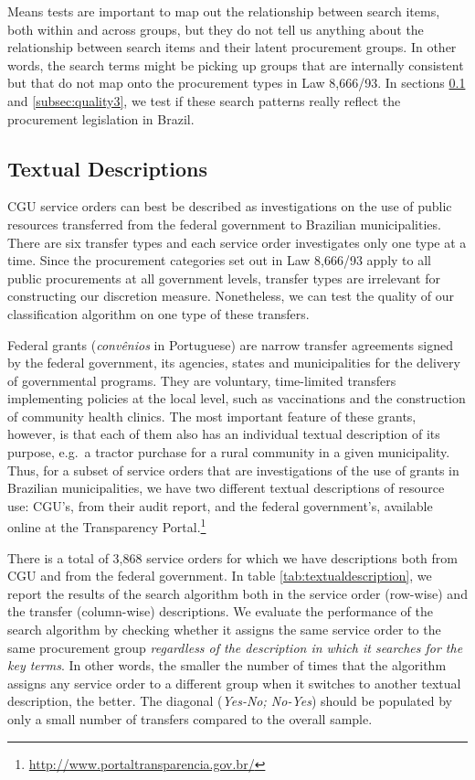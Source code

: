 \documentclass[11pt]{article}
\begin{document}
Means tests are important to map out the relationship between search items, both within and across groups, but they do not tell us anything about the relationship between search items and their latent procurement groups. In other words, the search terms might be picking up groups that are internally consistent but that do not map onto the procurement types in Law 8,666/93. In sections \ref{subsec:quality2} and \ref{subsec:quality3}, we test if these search patterns really reflect the procurement legislation in Brazil.

\subsection{Textual Descriptions}\label{subsec:quality2}

CGU service orders can best be described as investigations on the use of
public resources transferred from the federal government to Brazilian
municipalities. There are six transfer types and each service order
investigates only one type at a time. Since the procurement categories
set out in Law 8,666/93 apply to all public procurements at all
government levels, transfer types are irrelevant for constructing our
discretion measure. Nonetheless, we can test the quality of our classification algorithm on one type of these transfers.

Federal grants (\emph{convênios} in Portuguese) are narrow transfer
agreements signed by the federal government, its agencies, states and
municipalities for the delivery of governmental programs. They are
voluntary, time-limited transfers implementing policies at the local
level, such as vaccinations and the construction of community health
clinics. The most important feature of these grants, however, is that
each of them also has an individual textual description of its purpose,
e.g.~a tractor purchase for a rural community in a given municipality.
Thus, for a subset of service orders that are investigations of the use
of grants in Brazilian municipalities, we have two
different textual descriptions of resource use: CGU's, from their audit
report, and the federal government's, available online at the
Transparency Portal.\footnote{\url{http://www.portaltransparencia.gov.br/}}



There is a total of 3,868 service orders for which we have descriptions both from CGU and from the federal government. In table \ref{tab:textualdescription}, we report the results of the search algorithm both in the service order (row-wise) and the transfer (column-wise) descriptions. We evaluate the performance of the search algorithm by checking whether it assigns the same service order to the same procurement group \emph{regardless of the description in which it searches for the key terms}. In other words, the smaller the number of times that the algorithm assigns any service order to a different group when it switches to another textual description, the better. The diagonal (\emph{Yes-No; No-Yes}) should be populated by only a small number of transfers compared to the overall sample.
\end{document}
